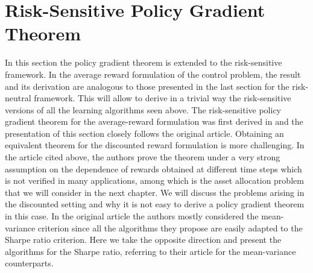 \section{Risk-Sensitive Policy Gradient Theorem}
In this section the policy gradient theorem is extended to the risk-sensitive framework. In the average reward formulation of the control problem, the result and its derivation are analogous to those presented in the last section for the risk-neutral framework. This will allow to derive in a trivial way the risk-sensitive versions of all the learning algorithms seen above. The risk-sensitive policy gradient theorem for the average-reward formulation was first derived in \cite{prashanth2014actor} and the presentation of this section closely follows the original article. Obtaining an equivalent theorem for the discounted reward formulation is more challenging. In the article cited above, the authors prove the theorem under a very strong assumption on the dependence of rewards obtained at different time steps which is not verified in many applications, among which is the asset allocation problem that we will consider in the next chapter. We will discuss the problems arising in the discounted setting and why it is not easy to derive a policy gradient theorem in this case. In the original article the authors mostly considered the mean-variance criterion since all the algorithms they propose are easily adapted to the Sharpe ratio criterion. Here we take the opposite direction and present the algorithms for the Sharpe ratio, referring to their article for the mean-variance counterparts.     


